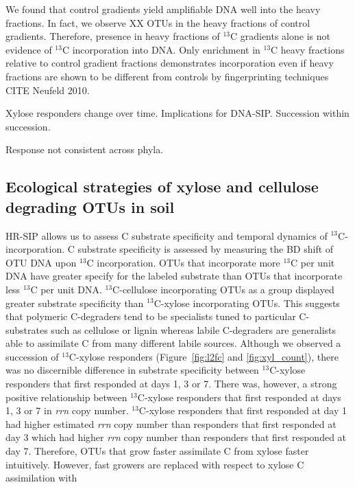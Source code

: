 We found that control gradients yield amplifiable DNA well into the heavy
fractions. In fact, we observe XX OTUs in the heavy fractions of control
gradients. Therefore, presence in heavy fractions of $^{13}$C gradients alone
is not evidence of $^{13}$C incorporation into DNA. Only enrichment in
$^{13}$C heavy fractions relative to control gradient fractions demonstrates
incorporation even if heavy fractions are shown to be different from controls
by fingerprinting techniques CITE Neufeld 2010.

Xylose responders change over time. Implications for DNA-SIP. Succession within
succession.

Response not consistent across phyla.

\subsection{Ecological strategies of xylose and cellulose degrading OTUs in
    soil}
HR-SIP allows us to assess C substrate specificity and temporal dynamics of
$^{13}$C-incorporation. C substrate specificity is assessed by measuring the 
BD shift of OTU DNA upon $^{13}$C incorporation. OTUs that incorporate more
$^{13}$C per unit DNA have greater specify for the labeled substrate than
OTUs that incorporate less $^{13}$C per unit DNA. $^{13}$C-cellulose 
incorporating OTUs as a group displayed greater substrate specificity than
$^{13}$C-xylose incorporating OTUs. This suggests that polymeric C-degraders
tend to be specialists tuned to particular C-substrates such as cellulose
or lignin whereas labile C-degraders are generalists able to assimilate
C from many different labile sources. Although we observed a succession of 
$^{13}$C-xylose responders (Figure~\ref{fig:l2fc} and \ref{fig:xyl_count}), 
there was no discernible difference in substrate specificity between 
$^{13}$C-xylose responders that first responded at days 1, 3 or 7. There was,
however, a strong positive relationship between $^{13}$C-xylose responders that
first responded at days 1, 3 or 7 in \textit{rrn} copy number. $^{13}$C-xylose 
responders that first responded at day 1 had higher estimated \textit{rrn} copy 
number than responders that first responded at day 3 which had higher
\textit{rrn} copy number than responders that first responded at day 7.
Therefore, OTUs that grow faster assimilate C from xylose faster intuitively.
However, fast growers are replaced with respect to xylose C assimilation with
